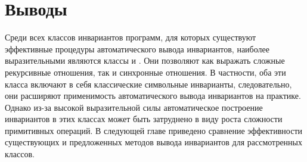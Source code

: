 \section{Выводы}
Среди всех классов инвариантов программ, для которых существуют эффективные процедуры автоматического вывода инвариантов, наиболее выразительными являются классы \syncRegFullClass{} и \regelemclass{}. Они позволяют как выражать сложные рекурсивные отношения, так и синхронные отношения. В частности, оба эти класса включают в себя классические символьные инварианты, следовательно, они расширяют применимость автоматического вывода инвариантов на практике. Однако из-за высокой выразительной силы автоматическое построение инвариантов в этих классах может быть затруднено в виду роста сложности примитивных операций.
В следующей главе приведено сравнение эффективности существующих и предложенных методов вывода инвариантов для рассмотренных классов.
